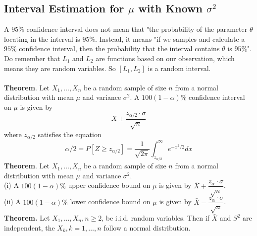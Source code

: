 \documentclass[a4paper,12pt]{article}
\begin{document}
\subsection{Interval Estimation for $\mu$ with Known $\sigma^2$ }
A $95\%$ confidence interval does not mean that "the probability of the parameter $\theta$ locating in the interval is $95\%$. Instead, it means "if we samples and calculate a $95\%$ confidence interval, then the probability that the interval contains $\theta$ is $95\%$". 
Do remember that $L_1$ and $L_2$ are functions based on our observation, which means they are random variables. So $[L_1,L_2]$ is a random interval.\\
~\\
\textbf{Theorem}. Let $X_1, \ldots, X_n$ be a random sample of size $n$ from a normal distribution with mean $\mu$ and variance $\sigma^2$. A $100(1-\alpha) \%$ confidence interval on $\mu$ is given by
\begin{equation}
\bar{X} \pm \dfrac{z_{\alpha / 2} \cdot \sigma}{\sqrt{n}}
\end{equation}
where $z_{\alpha/2}$ satisfies the equation
\begin{equation}
    \alpha / 2=P\left[Z \geq z_{\alpha / 2}\right]=\frac{1}{\sqrt{2 \pi}} \int_{z_{\alpha / 2}}^{\infty} e^{-x^2 / 2} d x
    \end{equation}
\textbf{Theorem}. Let $X_1, \ldots, X_n$ be a random sample of size $n$ from a normal distribution with mean $\mu$ and variance $\sigma^2$.\\
(i) A $100(1-\alpha) \%$ upper confidence bound on $\mu$ is given by $\bar{X}+\dfrac{z_\alpha \cdot \sigma}{\sqrt{n}}$.\\
(ii) A $100(1-\alpha) \%$ lower confidence bound on $\mu$ is given by $\bar{X}-\dfrac{z_\alpha \cdot \sigma}{\sqrt{n}}$.\\
\textbf{Theorem.} Let $X_1, \ldots, X_n, n \geq 2$, be i.i.d. random variables. Then if $\bar{X}$ and $S^2$ are independent, the $X_k, k=1, \ldots, n$ follow a normal distribution.\\
\end{document}
